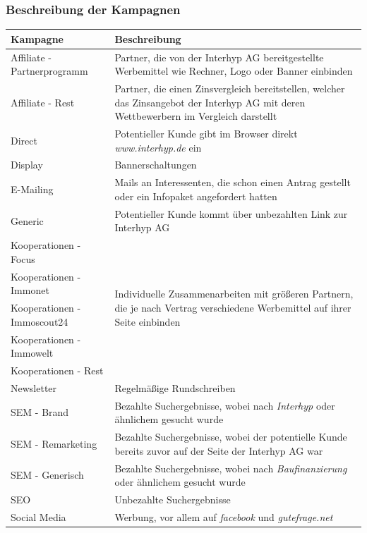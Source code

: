 \begin{frame}\frametitle{Beschreibung der Kampagnen}
	\begin{table}[H]
		\tiny
		\begin{center}
			\begin{tabular}{|l|p{7cm}|}
				\hline \textbf{Kampagne} & \textbf{Beschreibung}\\ \hline
				\hline Affiliate - Partnerprogramm & Partner, die von der Interhyp AG bereitgestellte Werbemittel wie Rechner, Logo oder Banner einbinden\\
				\hline Affiliate - Rest & Partner, die einen Zinsvergleich bereitstellen, welcher das Zinsangebot der Interhyp AG mit deren Wettbewerbern im Vergleich darstellt\\ 
				\hline Direct & Potentieller Kunde gibt im Browser direkt \textit{www.interhyp.de} ein\\ 
				\hline Display & Bannerschaltungen\\
				\hline E-Mailing & Mails an Interessenten, die schon einen Antrag gestellt oder ein Infopaket angefordert hatten\\
				\hline Generic & Potentieller Kunde kommt über unbezahlten Link zur Interhyp AG\\
				\hline Kooperationen - Focus & \multirow{5}{7cm}{Individuelle Zusammenarbeiten mit größeren Partnern, die je nach Vertrag verschiedene Werbemittel auf ihrer Seite einbinden}\\
				Kooperationen - Immonet & \\
				Kooperationen - Immoscout24 & \\
				Kooperationen - Immowelt & \\
				Kooperationen - Rest & \\
				\hline Newsletter & Regelmäßige Rundschreiben\\
				\hline SEM - Brand & Bezahlte Suchergebnisse, wobei nach \textit{Interhyp} oder ähnlichem gesucht wurde\\
				\hline SEM - Remarketing & Bezahlte Suchergebnisse, wobei der potentielle Kunde bereits zuvor auf der Seite der Interhyp AG war\\
				\hline SEM - Generisch & Bezahlte Suchergebnisse, wobei nach \textit{Baufinanzierung} oder ähnlichem gesucht wurde\\
				\hline SEO & Unbezahlte Suchergebnisse\\
				\hline Social Media & Werbung, vor allem auf \textit{facebook} und \textit{gutefrage.net}\\
				\hline
			\end{tabular} 
		\end{center}
	\end{table}
\end{frame}

